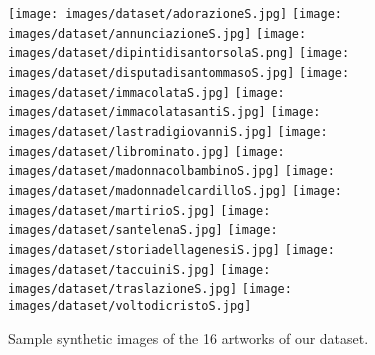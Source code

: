 \documentclass[preprint]{elsarticle}
\begin{document}
\begin{figure*}[t!]
            \centering            
            \texttt{[image: images/dataset/adorazioneS.jpg]}
            \texttt{[image: images/dataset/annunciazioneS.jpg]}
            \vspace{0.1cm}
            \texttt{[image: images/dataset/dipintidisantorsolaS.png]}
            \texttt{[image: images/dataset/disputadisantommasoS.jpg]}
            \texttt{[image: images/dataset/immacolataS.jpg]}
            \texttt{[image: images/dataset/immacolatasantiS.jpg]}
            \vspace{0.1cm}
            \texttt{[image: images/dataset/lastradigiovanniS.jpg]}
            \texttt{[image: images/dataset/librominato.jpg]}
            \texttt{[image: images/dataset/madonnacolbambinoS.jpg]}
            \texttt{[image: images/dataset/madonnadelcardilloS.jpg]}
            \texttt{[image: images/dataset/martirioS.jpg]}
            \texttt{[image: images/dataset/santelenaS.jpg]}
            \texttt{[image: images/dataset/storiadellagenesiS.jpg]}
            \texttt{[image: images/dataset/taccuiniS.jpg]}
            \texttt{[image: images/dataset/traslazioneS.jpg]}
            \texttt{[image: images/dataset/voltodicristoS.jpg]}
            \caption{\label{fig:synthetic}Sample synthetic images of the 16 artworks of our dataset.}
            

\end{figure*}
\end{document}
